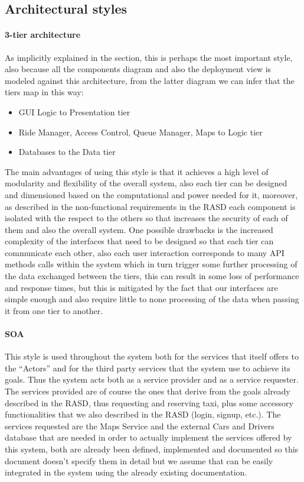 \subsection{Architectural styles}
\paragraph{3-tier architecture}
As implicitly explained in the  section, this is perhaps the most important style, also because all the components diagram and also the deployment view is modeled against this architecture, from the latter diagram we can infer that the tiers map in this way:
\begin{itemize}
	\item GUI Logic to Presentation tier 
	\item Ride Manager, Access Control, Queue Manager, Maps to Logic tier
	\item Databases to the Data tier
\end{itemize}
The main advantages of using this style is that it achieves a high level of modularity and flexibility of the overall system, also each tier can be designed and dimensioned based on the computational and power needed for it, moreover, as described in the non-functional requirements in the RASD each component is isolated with the respect to the others so that increases the security of each of them and also the overall system. One possible drawbacks is the increased complexity of the interfaces that need to be designed so that each tier can communicate each other, also each user interaction corresponds to many API methods calls within the system which in turn trigger some further processing of the data exchanged between the tiers, this can result in some loss of performance and response times, but this is mitigated by the fact that our interfaces are simple enough and also require little to none processing of the data when passing it from one tier to another.
\paragraph{SOA}
This style is used throughout the system both for the services that itself offers to the ``Actors'' and for the third party services that the system use to achieve its goals. Thus the system acts both as a service provider and as a service requester. \newline
The services provided are of course the ones that derive from the goals already described in the RASD, thus requesting and reserving taxi, plus some accessory functionalities that we also described in the RASD (login, signup, etc.).\newline
The services requested are the Maps Service and the external Cars and Drivers database that are needed in order to actually implement the services offered by this system, both are already been defined, implemented and documented so this document doesn't specify them in detail but we assume that can be easily integrated in the system using the already existing documentation. 
